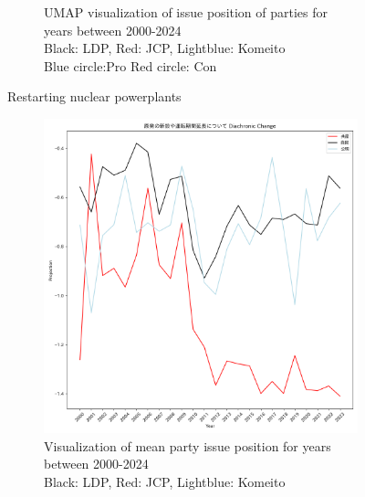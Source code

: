 \documentclass[final,5p,times,twocolumn,authoryear]{elsarticle}
\begin{document}
\begin{figure}[h]
\begin{subfigure}{0.48\textwidth}
		  \caption{UMAP visualization of issue position of parties for years between 2000-2024 \\\hspace{\textwidth} 
		  Black: LDP, Red: JCP, Lightblue: Komeito\\\hspace{\textwidth}
		  Blue circle:Pro Red circle: Con}
		\end{subfigure}
	\caption{Restarting nuclear powerplants}
	\label{fig: results-diachronic-nuclear-restart}
\end{figure}

\begin{figure}[h]
	\centering
		\begin{subfigure}{0.48\textwidth}
		  \centering
		  \includegraphics[width=\textwidth]{figs/results/diachronic_nuclear/原発の新設や運転期間延長について_原発_diachronic_change.png}
		  \caption{Visualization of mean party issue position for years between 2000-2024 \\\hspace{\textwidth} Black: LDP, Red: JCP, Lightblue: Komeito}
		  \label{fig:sub1}
		\end{subfigure}
		\hfill
		\begin{subfigure}{0.48\textwidth}
		  \centering

\end{subfigure}
\end{figure}
\end{document}

